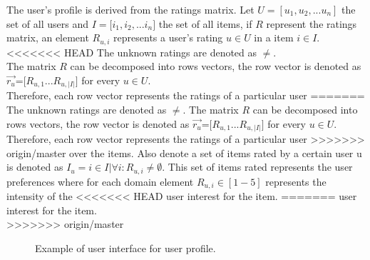 The user's profile is derived from the ratings matrix. Let
$U=[u_1,u_2,...u_n]$ the set of all users and $ I=[i_1,i_2,$...$i_n] $
the set of all items, if $R$ represent the ratings matrix,  an element
$R_{u,i}$ represents a user’s rating $u \in U$  in a item $i \in I$.
<<<<<<< HEAD
The unknown ratings are denoted as $\neq $. \\ The matrix $R$ can be
decomposed into rows vectors, the row vector is denoted as $
\overrightarrow{r_u} $=$[R_{u,1}$...$R_{u,|I|}]$ for every $u \in U$.
\\ Therefore, each row vector represents the ratings of a particular user
=======
The unknown ratings are denoted as $\neq $. The matrix $R$ can be
decomposed into rows vectors, the row vector is denoted as $
\overrightarrow{r_u} $=$[R_{u,1}$...$R_{u,|I|}]$ for every $u \in U$.
Therefore, each row vector represents the ratings of a particular user
>>>>>>> origin/master
over the items. Also denote a set of items rated by a certain user u
is denoted as $ I_u = i \in I | \forall  i: R_{u,i} \neq \emptyset $.
This set of items rated represents the user preferences where for each
domain element $R_{u,i} \in [1-5]$ represents the intensity of the
<<<<<<< HEAD
user interest for  the item.
=======
user interest for  the item.\\

>>>>>>> origin/master
\begin{figure}
\captionsetup{justification=centering,margin=2cm,font=footnotesize}
\centering
\setlength\fboxsep{0pt}
\caption{Example of user interface for user profile.}
\label{fig:user-profile}      
\end{figure}

